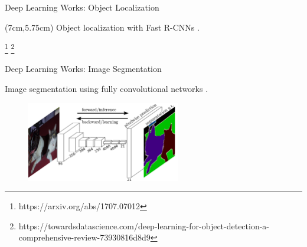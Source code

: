 \documentclass[notheorems]{beamer}
\newcommand{\source}[1]{{\let\thefootnote\relax\footnote{{\tiny #1}}}}
\begin{document}
\begin{frame}{Deep Learning Works: Object Localization}
        \begin{textblock*}{5cm}(7cm,5.75cm) %
           Object localization with Fast R-CNNs \cite{girshick2015fast}.
        \end{textblock*}

        \source{https://arxiv.org/abs/1707.07012}
        \source{https://towardsdatascience.com/deep-learning-for-object-detection-a-comprehensive-review-73930816d8d9}
    \end{frame}

    \begin{frame}{Deep Learning Works: Image Segmentation}

        Image segmentation using fully convolutional networks \cite{long2015fully}.

        \begin{figure}
            \centering
            \includegraphics[width=0.6\textwidth]{figures/alex-model}
        \end{figure}
        \vspace{-0.5cm}
        \begin{figure}
            \centering
\end{figure}
\end{frame}
\end{document}
